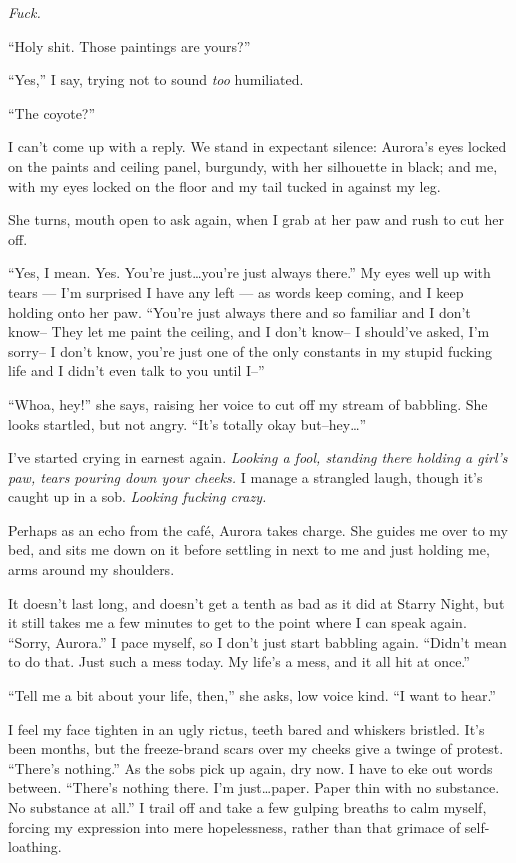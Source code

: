 \emph{Fuck.}

``Holy shit. Those paintings are yours?''

``Yes,'' I say, trying not to sound \emph{too} humiliated.

``The coyote?''

I can't come up with a reply. We stand in expectant silence: Aurora's eyes locked on the paints and ceiling panel, burgundy, with her silhouette in black; and me, with my eyes locked on the floor and my tail tucked in against my leg.

She turns, mouth open to ask again, when I grab at her paw and rush to cut her off.

``Yes, I mean. Yes. You're just\ldots{}you're just always there.'' My eyes well up with tears --- I'm surprised I have any left --- as words keep coming, and I keep holding onto her paw. ``You're just always there and so familiar and I don't know-- They let me paint the ceiling, and I don't know-- I should've asked, I'm sorry-- I don't know, you're just one of the only constants in my stupid fucking life and I didn't even talk to you until I--''

``Whoa, hey!'' she says, raising her voice to cut off my stream of babbling. She looks startled, but not angry. ``It's totally okay but--hey\ldots{}''

I've started crying in earnest again. \emph{Looking a fool, standing there holding a girl's paw, tears pouring down your cheeks.} I manage a strangled laugh, though it's caught up in a sob. \emph{Looking fucking crazy.}

Perhaps as an echo from the café, Aurora takes charge. She guides me over to my bed, and sits me down on it before settling in next to me and just holding me, arms around my shoulders.

It doesn't last long, and doesn't get a tenth as bad as it did at Starry Night, but it still takes me a few minutes to get to the point where I can speak again. ``Sorry, Aurora.'' I pace myself, so I don't just start babbling again. ``Didn't mean to do that. Just such a mess today. My life's a mess, and it all hit at once.''

``Tell me a bit about your life, then,'' she asks, low voice kind. ``I want to hear.''

I feel my face tighten in an ugly rictus, teeth bared and whiskers bristled. It's been months, but the freeze-brand scars over my cheeks give a twinge of protest. ``There's nothing.'' As the sobs pick up again, dry now. I have to eke out words between. ``There's nothing there. I'm just\ldots{}paper. Paper thin with no substance. No substance at all.'' I trail off and take a few gulping breaths to calm myself, forcing my expression into mere hopelessness, rather than that grimace of self-loathing.

